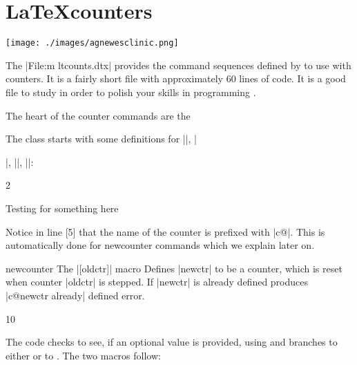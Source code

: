 \chapter{\LaTeX counters}

\thispagestyle{plain}
{\centering\texttt{[image: ./images/agnewesclinic.png]}\par}

{\centering {}\par}


The |File:m ltcounts.dtx| provides the command sequences defined by \latex to use with counters. It is a fairly short file with approximately 
60 lines of code. It is a good file to study in order to polish your skills in programming \tex. 

The heart of the counter commands are the 

The class starts with some definitions for |\setcounter|, |\addtocounter|, |\newcounter|, |\value|:


\begin{teXXX}
2 \def\setcounter#1#2{%
3   \@ifundefined{c@#1}%
4      {\@nocounterr{#1}}%
5      {\global\csname c@#1\endcsname#2\relax}}
\end{teXXX}


Testing for something here

Notice in line [5] that the name of the counter is prefixed with |c@|. This is automatically done for newcounter commands which we explain later on.



\begin{docCommand}{newcounter}{}
The |[oldctr]| macro  Defines |newctr| to be a counter, which is
reset when counter |oldctr|  is stepped. If |newctr| is  already defined produces
|c@newctr already| defined  error.
\end{docCommand}

\begin{teXXX}
10 \def\newcounter#1{%
11   \expandafter\@ifdefinable \csname c@#1\endcsname
12   {\@definecounter{#1}}%
13   \@ifnextchar[{\@newctr{#1}}{}}
\end{teXXX}

The code checks to see, if an optional value is provided, using  and branches to either
 or to . The two macros follow:

